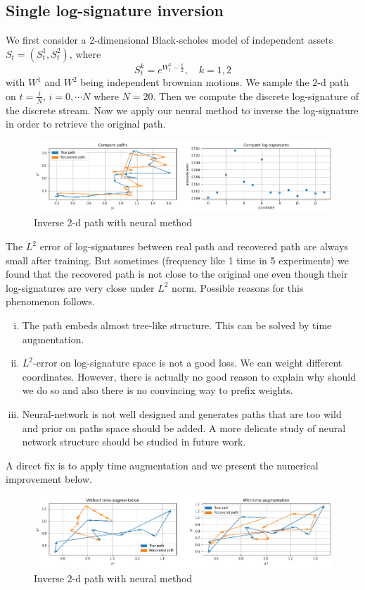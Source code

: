 \documentclass[12pt]{report}
\theoremstyle{definition}
\theoremstyle{remark}
\begin{document}
\subsection{Single log-signature inversion}
We first consider a 2-dimensional Black-scholes model of independent assets $S_{t} = (S^{1}_{t}, S^{2}_{t})$, where
\begin{equation*}
  S^{k}_{t} = e^{W^{k}_{t} - \frac{t}{2}},\quad k = 1,2
\end{equation*}
with $W^{1}$ and $W^{2}$ being independent brownian motions. We sample the $2$-d path on $t = \frac{i}{N}$, $i = 0,\cdots N$ where $N = 20$. Then we compute the discrete log-signature of the discrete stream. Now we apply our neural method to inverse the log-signature in order to retrieve the original path.
 \begin{figure}[H]
    \centering
    \includegraphics[width=\textwidth]{figs/inverse2.png}
    \caption{Inverse 2-d path with neural method}
\end{figure}
The $L^{2}$ error of log-signatures between real path and recovered path are always small after training. But sometimes (frequency like 1 time in 5 experiments) we found that the recovered path is not close to the original one even though their log-signatures are very close under $L^{2}$ norm. Possible reasons for this phenomenon follows.
\begin{enumerate}[(i)]
  \item The path embeds almost tree-like structure. This can be solved by time augmentation. 
  \item $L^{2}$-error on log-signature space is not a good loss. We can weight different coordinates. However, there is actually no good reason to explain why should we do so and also there is no convincing way to prefix weights.
  \item Neural-network is not well designed and generates paths that are too wild and prior on paths space should be added. A more delicate study of neural network structure should be studied in future work.
\end{enumerate}
A direct fix is to apply time augmentation and we present the numerical improvement below. 
\begin{figure}[H]
  \centering
  \includegraphics[width=\textwidth]{figs/inverse7.png}
  \caption{Inverse 2-d path with neural method}
\end{figure}
\end{document}
